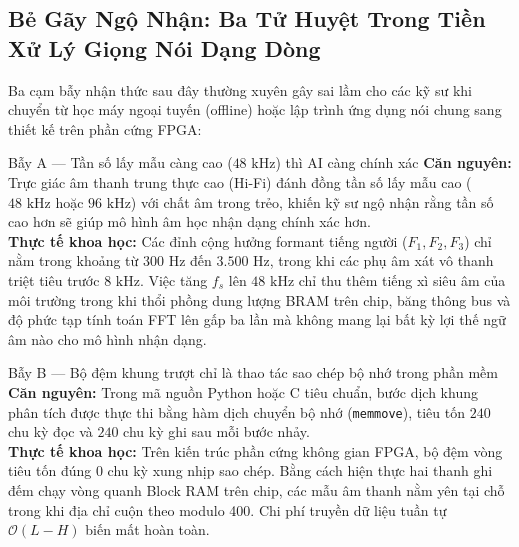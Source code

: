 \documentclass[11pt,a4paper]{article}
\begin{document}

\subsection*{Bẻ Gãy Ngộ Nhận: Ba Tử Huyệt Trong Tiền Xử Lý Giọng Nói Dạng Dòng}

Ba cạm bẫy nhận thức sau đây thường xuyên gây sai lầm cho các kỹ sư khi chuyển từ học máy ngoại tuyến (offline) hoặc lập trình ứng dụng nói chung sang thiết kế trên phần cứng FPGA:

\begin{misconceptionbox}{Bẫy A --- Tần số lấy mẫu càng cao ($48\text{ kHz}$) thì AI càng chính xác}
\textbf{Căn nguyên:} Trực giác âm thanh trung thực cao (Hi-Fi) đánh đồng tần số lấy mẫu cao ($48\text{ kHz}$ hoặc $96\text{ kHz}$) với chất âm trong trẻo, khiến kỹ sư ngộ nhận rằng tần số cao hơn sẽ giúp mô hình âm học nhận dạng chính xác hơn.\\[1mm]
\textbf{Thực tế khoa học:} Các đỉnh cộng hưởng formant tiếng người ($F_1, F_2, F_3$) chỉ nằm trong khoảng từ $300\text{ Hz}$ đến $3.500\text{ Hz}$, trong khi các phụ âm xát vô thanh triệt tiêu trước $8\text{ kHz}$. Việc tăng $f_s$ lên $48\text{ kHz}$ chỉ thu thêm tiếng xì siêu âm của môi trường trong khi thổi phồng dung lượng BRAM trên chip, băng thông bus và độ phức tạp tính toán FFT lên gấp ba lần mà không mang lại bất kỳ lợi thế ngữ âm nào cho mô hình nhận dạng.
\end{misconceptionbox}

\begin{misconceptionbox}{Bẫy B --- Bộ đệm khung trượt chỉ là thao tác sao chép bộ nhớ trong phần mềm}
\textbf{Căn nguyên:} Trong mã nguồn Python hoặc C tiêu chuẩn, bước dịch khung phân tích được thực thi bằng hàm dịch chuyển bộ nhớ (\texttt{memmove}), tiêu tốn $240$ chu kỳ đọc và $240$ chu kỳ ghi sau mỗi bước nhảy.\\[1mm]
\textbf{Thực tế khoa học:} Trên kiến trúc phần cứng không gian FPGA, bộ đệm vòng tiêu tốn đúng 0 chu kỳ xung nhịp sao chép. Bằng cách hiện thực hai thanh ghi đếm chạy vòng quanh Block RAM trên chip, các mẫu âm thanh nằm yên tại chỗ trong khi địa chỉ cuộn theo modulo 400. Chi phí truyền dữ liệu tuần tự $\mathcal{O}(L - H)$ biến mất hoàn toàn.
\end{misconceptionbox}
\end{document}
